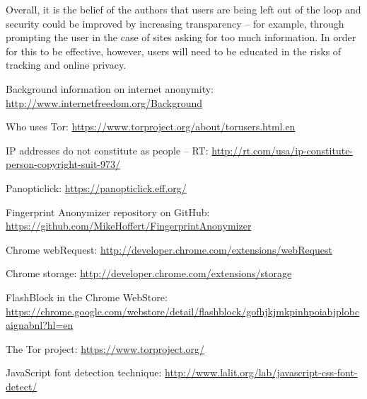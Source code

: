 \documentclass[12pt,a4paper]{article}
\begin{document}
Overall, it is the belief of the authors that users are being left out of the loop and security could be improved by increasing transparency -- for example, through prompting the user in the case of sites asking for too much information. In order for this to be effective, however, users will need to be educated in the risks of tracking and online privacy.

\begin{thebibliography}{0}

  Background information on internet anonymity: \url{http://www.internetfreedom.org/Background}
  
  Who uses Tor: \url{https://www.torproject.org/about/torusers.html.en}
  
  IP addresses do not constitute as people -- RT: \url{http://rt.com/usa/ip-constitute-person-copyright-suit-973/}

  Panopticlick: \url{https://panopticlick.eff.org/}

  Fingerprint Anonymizer repository on GitHub: \url{https://github.com/MikeHoffert/FingerprintAnonymizer}

  Chrome webRequest: \url{http://developer.chrome.com/extensions/webRequest}
  
  Chrome storage: \url{http://developer.chrome.com/extensions/storage}
  
  FlashBlock in the Chrome WebStore: \url{https://chrome.google.com/webstore/detail/flashblock/gofhjkjmkpinhpoiabjplobcaignabnl?hl=en}
  
  The Tor project: \url{https://www.torproject.org/}

  JavaScript font detection technique: \url{http://www.lalit.org/lab/javascript-css-font-detect/}

\end{thebibliography}
\end{document}
